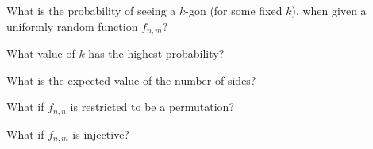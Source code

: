 \documentclass{article}
\begin{document}
\begin{question}
  What is the probability of seeing a $k$-gon (for some fixed $k$), when given
  a uniformly random function $f_{n,m}$?
\end{question}

\begin{related}
  \item What value of $k$ has the highest probability?
  \item What is the expected value of the number of sides?
  \item What if $f_{n,n}$ is restricted to be a permutation?
  \item What if $f_{n,m}$ is injective?
\end{related}
\end{document}
